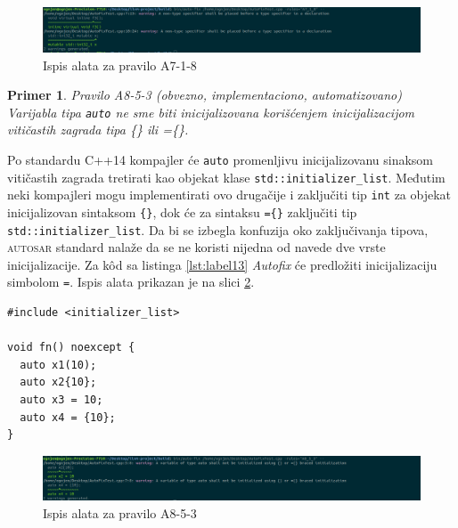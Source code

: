 \documentclass[12pt,oneside]{memoir}
\newtheorem{primer}{Primer}[section]
\begin{document}
\begin{figure}[!h]
\begin{center}
\includegraphics[scale=0.3]{A7-1-8.png}
\end{center}
\caption{Ispis alata za pravilo A7-1-8}
\label{fig:A7-1-8}
\end{figure}

\begin{primer}
Pravilo A8-5-3 (obvezno, implementaciono, automatizovano) \\
Varijabla tipa \texttt{auto} ne sme biti inicijalizovana kori\v{s}\'{c}enjem
inicijalizacijom viti\v{c}astih zagrada tipa \{\} ili =\{\}.
\end{primer}

Po standardu C++14 kompajler \'{c}e \texttt{auto} promenljivu inicijalizovanu sinaksom viti\v{c}astih zagrada tretirati kao objekat klase
\texttt{std::initializer\_list}. Međutim neki kompajleri mogu implementirati ovo druga\v{c}ije i zaklju\v{c}iti tip \texttt{int} za objekat inicijalizovan
sintaksom \texttt{\{\}}, dok \'{c}e za sintaksu \texttt{=\{\}} zaklju\v{c}iti tip \texttt{std::initializer\_list}. Da bi se izbegla konfuzija oko zaklju\v{c}ivanja
tipova, \textsc{autosar} standard nala\v{z}e da se ne koristi nijedna od navede dve vrste inicijalizacije. Za k\^{o}d sa listinga \ref{lst:label13} \textit{Autofix} \'{c}e
predlo\v{z}iti inicijalizaciju simbolom \texttt{=}. Ispis alata prikazan je na slici \ref{fig:A8-5-3}. \\

\begin{lstlisting}[style=customc, caption={Primer koda koji nije napisan u skladu sa pravilom A8-5-3.}, label=lst:label13]
#include <initializer_list>

void fn() noexcept {
  auto x1(10);
  auto x2{10};
  auto x3 = 10;
  auto x4 = {10};
}

\end{lstlisting}

\begin{figure}[!h]
\begin{center}
\includegraphics[scale=0.3]{A8-5-3.png}
\end{center}
\caption{Ispis alata za pravilo A8-5-3}
\label{fig:A8-5-3}
\end{figure}
\end{document}
